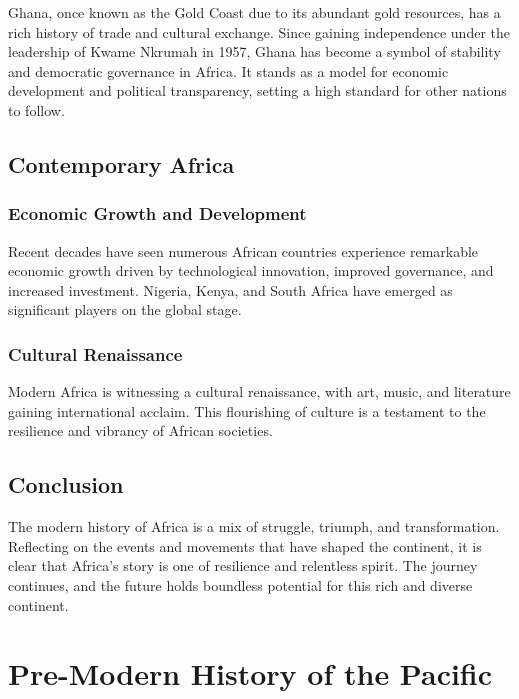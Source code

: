\documentclass{book}
\begin{document}
Ghana, once known as the Gold Coast due to its abundant gold resources, has a rich history of trade and cultural exchange. Since gaining independence under the leadership of Kwame Nkrumah in 1957, Ghana has become a symbol of stability and democratic governance in Africa. It stands as a model for economic development and political transparency, setting a high standard for other nations to follow.

\section{Contemporary Africa}
\label{sec:contemporary-africa}

\subsection{Economic Growth and Development}
\label{subsec:economic-growth-and-development}

Recent decades have seen numerous African countries experience remarkable economic growth driven by technological innovation, improved governance, and increased investment. Nigeria, Kenya, and South Africa have emerged as significant players on the global stage.

\subsection{Cultural Renaissance}
\label{subsec:cultural-renaissance}

Modern Africa is witnessing a cultural renaissance, with art, music, and literature gaining international acclaim. This flourishing of culture is a testament to the resilience and vibrancy of African societies.

\section{Conclusion}
\label{sec:conclusion-modern-africa}

The modern history of Africa is a mix of struggle, triumph, and transformation. Reflecting on the events and movements that have shaped the continent, it is clear that Africa’s story is one of resilience and relentless spirit. The journey continues, and the future holds boundless potential for this rich and diverse continent.

\chapter{Pre-Modern History of the Pacific}
\label{ch:pre-modern-pacific-history}
\end{document}
